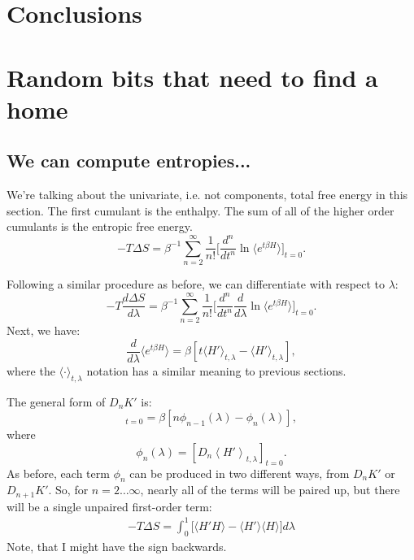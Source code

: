 \documentclass{article}
\begin{document}
\section{Conclusions}

\section*{Random bits that need to find a home}
\subsection*{We can compute entropies...}

We're talking about the univariate, i.e. not components, total free energy in this section. The first cumulant is the enthalpy. The sum of all of the higher order cumulants is the entropic free energy.
\begin{equation}
-T \Delta S = \beta^{-1} \sum_{n=2}^\infty \frac{1}{n!}
	\Bigg[ 
		\frac{d^n}{dt^n}
		\ln \langle e^{t\beta H} \rangle
	\Bigg]_{t=0}.
\end{equation}

Following a similar procedure as before, we can differentiate with respect to $\lambda$:
\begin{equation}
-T\frac{d\Delta S}{d\lambda} = \beta^{-1} \sum_{n=2}^\infty \frac{1}{n!}
	\Bigg[ 
		\frac{d^n}{dt^n}
		\frac{d}{d\lambda} \ln \langle e^{t \beta H} \rangle
	\Bigg]_{t=0}.
\end{equation}
Next, we have:
\begin{equation}
\frac{d}{d\lambda} \langle e^{t \beta H} \rangle =
\beta \left[
	t \langle H' \rangle_{t, \lambda} - \langle H' \rangle_{t, \lambda}
\right],
\end{equation}
where the $\langle \cdot \rangle_{t,\lambda}$ notation has a similar meaning to previous sections.

The general form of $D_n K'$ is:
\begin{equation}
[D_n K_\lambda']_{t=0} =
	\beta\left[
		n \phi_{n-1}(\lambda) -
    	\phi_n(\lambda)
    \right],
\end{equation}
where
\begin{equation}
\phi_n(\lambda) =
	\left[ D_n \left\langle
    	H'
    \right\rangle_{t, \lambda} \right]_{t=0}.
\end{equation}
As before, each term $\phi_n$ can be produced in two different ways, from $D_n K'$ or $D_{n+1} K'$. So, for $n=2\ldots\infty$, nearly all of the terms will be paired up, but there will be a single unpaired first-order term:
\begin{align}
-T \Delta S = \int_0^1
	\Bigg[ 
		\langle H' H \rangle - \langle H' \rangle \langle H \rangle
	\Bigg] d\lambda
\end{align}
Note, that I might have the sign backwards.
\end{document}

